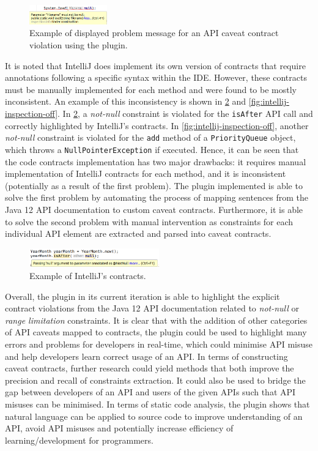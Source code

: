 \begin{figure}
	\label{fig:plugin-problem}
	\centering
	\includegraphics[width=0.3\textwidth]{figs/plugin-problem.png}
	\caption{Example of displayed problem message for an API caveat contract violation using the plugin.}
\end{figure}

It is noted that IntelliJ does implement its own version of contracts that require annotations following a specific syntax within the IDE. However, these contracts must be manually implemented for each method and were found to be mostly inconsistent. An example of this inconsistency is shown in \ref{fig:intellij-inspection-on} and \ref{fig:intellij-inspection-off}. In \ref{fig:intellij-inspection-on}, a \textit{not-null} constraint is violated for the \lstinline{isAfter} API call and correctly highlighted by IntelliJ's contracts. In \ref{fig:intellij-inspection-off}, another \textit{not-null} constraint is violated for the \lstinline{add} method of a \lstinline{PriorityQueue} object, which throws a \lstinline{NullPointerException} if executed. Hence, it can be seen that the code contracts implementation has two major drawbacks: it requires manual implementation of IntelliJ contracts for each method, and it is inconsistent (potentially as a result of the first problem). The plugin implemented is able to solve the first problem by automating the process of mapping sentences from the Java 12 API documentation to custom caveat contracts. Furthermore, it is able to solve the second problem with manual intervention as constraints for each individual API element are extracted and parsed into caveat contracts.

\begin{figure}
	\label{fig:intellij-inspection-on}
	\centering
	\includegraphics[width=0.5\textwidth]{figs/intellij-inspection-on.png}
	\caption{Example of IntelliJ's contracts.}
\end{figure}

Overall, the plugin in its current iteration is able to highlight the explicit contract violations from the Java 12 API documentation related to \textit{not-null} or \textit{range limitation} constraints. It is clear that with the addition of other categories of API caveats mapped to contracts, the plugin could be used to highlight many errors and problems for developers in real-time, which could minimise API misuse and help developers learn correct usage of an API. In terms of constructing caveat contracts, further research could yield methods that both improve the precision and recall of constraints extraction. It could also be used to bridge the gap between developers of an API and users of the given APIs such that API misuses can be minimised. In terms of static code analysis, the plugin shows that natural language can be applied to source code to improve understanding of an API, avoid API misuses and potentially increase efficiency of learning/development for programmers.

